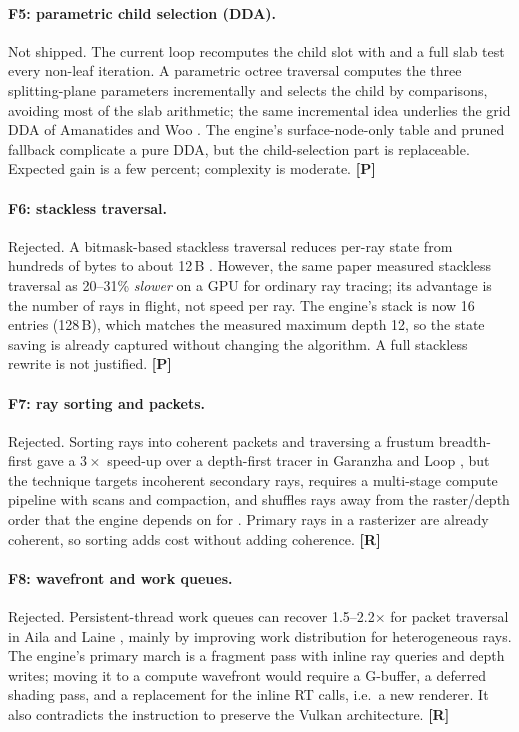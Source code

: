 \documentclass[11pt,a4paper]{article}
\newcommand{\evR}{\textsf{\textbf{\color{evR}[R]}}}
\newcommand{\evP}{\textsf{\textbf{\color{evP}[P]}}}
\newcommand{\code}[1]{\texttt{\detokenize{#1}}}
\theoremstyle{plain}
\theoremstyle{definition}
\theoremstyle{remark}
\begin{document}
\paragraph{F5: parametric child selection (DDA).} Not shipped. The current loop
recomputes the child slot with \code{floor(local*2)} and a full slab test every
non-leaf iteration. A parametric octree traversal \cite{revelles2000} computes
the three splitting-plane parameters incrementally and selects the child by
comparisons, avoiding most of the slab arithmetic; the same incremental idea
underlies the grid DDA of Amanatides and Woo \cite{amanatides1987}. The
engine's surface-node-only table and pruned fallback complicate a pure DDA,
but the child-selection part is replaceable. Expected gain is a few percent;
complexity is moderate. \evP

\paragraph{F6: stackless traversal.} Rejected. A bitmask-based stackless
traversal reduces per-ray state from hundreds of bytes to about 12\,B
\cite{afra2014}. However, the same paper measured stackless traversal as
20--31\% \emph{slower} on a GPU for ordinary ray tracing; its advantage is the
number of rays in flight, not speed per ray. The engine's stack is now 16
entries (128\,B), which matches the measured maximum depth 12, so the state
saving is already captured without changing the algorithm. A full stackless
rewrite is not justified. \evP

\paragraph{F7: ray sorting and packets.} Rejected. Sorting rays into coherent
packets and traversing a frustum breadth-first gave a $3\times$ speed-up over a
depth-first tracer in Garanzha and Loop \cite{garanzha2010}, but the technique
targets incoherent secondary rays, requires a multi-stage compute pipeline
with scans and compaction, and shuffles rays away from the raster/depth order
that the engine depends on for \code{gl_FragDepth}. Primary rays in a
rasterizer are already coherent, so sorting adds cost without adding
coherence. \evR

\paragraph{F8: wavefront and work queues.} Rejected. Persistent-thread work
queues can recover 1.5--2.2$\times$ for packet traversal in Aila and Laine
\cite{aila2009}, mainly by improving work distribution for heterogeneous rays.
The engine's primary march is a fragment pass with inline ray queries and
depth writes; moving it to a compute wavefront would require a G-buffer, a
deferred shading pass, and a replacement for the inline RT calls, i.e.\ a new
renderer. It also contradicts the instruction to preserve the Vulkan
architecture. \evR
\end{document}
